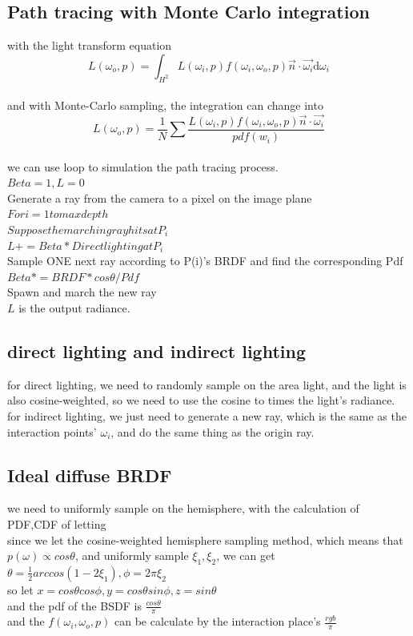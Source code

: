 \documentclass[acmtog]{acmart}
\begin{document}
\subsection{Path tracing with Monte Carlo integration}
with the light transform equation\\
\[L(\omega_o, p) = \int_{H^2} L(\omega_i, p) f(\omega_i, \omega_o, p) \vec{n}\cdot \vec{\omega_i} \mathrm{d}\omega_i\]\\
and with Monte-Carlo sampling, the integration can change into \\
\[L(\omega_o, p) = \frac{1}{N} \sum \frac{L(\omega_i, p) f(\omega_i, \omega_o, p) \vec{n}\cdot \vec{\omega_i}}{pdf(w_i)}\]\\
we can use loop to simulation the path tracing process.\\
$Beta = 1, L = 0$\\
Generate a ray from the camera to a pixel on the image plane\\
$For i = 1 to max depth$\\
$Suppose the marching ray hits at P_i$\\
$L += Beta * Direct lighting at P_i$\\
Sample ONE next ray according to P(i)'s BRDF and find the corresponding Pdf\\
$Beta *= BRDF * cos\theta / Pdf$\\
Spawn and march the new ray  \\
$L$ is the output radiance.\\

\subsection{direct lighting and indirect lighting }
for direct lighting, we need to randomly sample on the area light, and the light is also cosine-weighted,
so we need to use the cosine to times the light's radiance.\\

for indirect lighting, we just need to generate a new ray, which is the same as the interaction points' $\omega_i$,
and do the same thing as the origin ray.\\

\subsection{Ideal diffuse BRDF}
we need to uniformly sample on the hemisphere, with the calculation of PDF,CDF of letting\\
since we let the cosine-weighted hemisphere sampling method, which means that $p(\omega)\propto cos\theta$,
and uniformly sample $\xi_1,\xi_2$, we can get\\
$ \theta = \frac{1}{2} arccos(1 - 2\xi_1), \phi = 2\pi \xi_2$\\
so let $x = cos\theta cos\phi, y = cos\theta sin\phi, z = sin\theta$\\
and the pdf of the BSDF is $\frac{cos\theta}{\pi}$\\
and the $f(\omega_i, \omega_o, p)$ can be calculate by the interaction place's $\frac{rgb}{\pi}$\\
\end{document}
